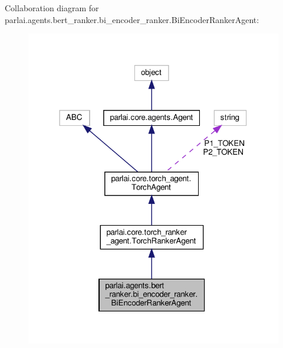 Collaboration diagram for parlai.\+agents.\+bert\+\_\+ranker.\+bi\+\_\+encoder\+\_\+ranker.\+Bi\+Encoder\+Ranker\+Agent\+:
\nopagebreak
\begin{figure}[H]
\begin{center}
\leavevmode
\includegraphics[width=318pt]{classparlai_1_1agents_1_1bert__ranker_1_1bi__encoder__ranker_1_1BiEncoderRankerAgent__coll__graph}
\end{center}
\end{figure}
